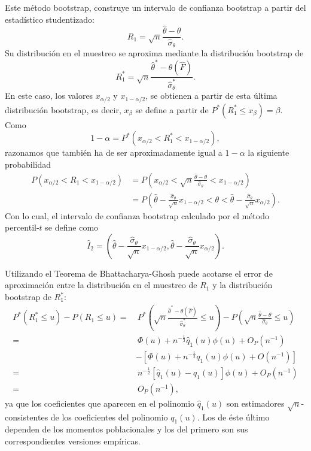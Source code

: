 \documentclass[]{book}
\theoremstyle{definition}
\theoremstyle{definition}
\theoremstyle{definition}
\theoremstyle{remark}
\begin{document}
Este método bootstrap, construye un intervalo de confianza bootstrap a
partir del estadístico studentizado:
\[R_1=\sqrt{n}\frac{\hat{\theta}-\theta }{\hat{\sigma}_{\theta }}.\] Su
distribución en el muestreo se aproxima mediante la distribución
bootstrap de
\[R_1^{\ast}=\sqrt{n}\frac{\hat{\theta}^{\ast}-\theta \left( \hat{F}
 \right)}{\hat{\sigma}_{\theta }^{\ast}}.\] En este caso, los valores
\(x_{\alpha /2}\) y \(x_{1-\alpha /2}\), se obtienen a partir de esta
última distribución bootstrap, es decir, \(x_{\beta }\) se define a
partir de \(P^{\ast}\left( R_1^{\ast}\leq x_{\beta } \right) =\beta\).
Como
\[1-\alpha =P^{\ast}\left( x_{\alpha /2}<R_1^{\ast}<x_{1-\alpha /2} \right),\]
razonamos que también ha de ser aproximadamente igual a \(1-\alpha\) la
siguiente probabilidad \[\begin{aligned}
P\left( x_{\alpha /2}<R_1<x_{1-\alpha /2} \right) &= P\left( x_{\alpha /2}<
\sqrt{n}\frac{\hat{\theta}-\theta }{\hat{\sigma}_{\theta }}<x_{1-\alpha
/2} \right) \\
&= P\left( \hat{\theta}-\frac{\hat{\sigma}_{\theta }}{\sqrt{n}}x_{1-\alpha
/2}<\theta <\hat{\theta}-\frac{\hat{\sigma}_{\theta }}{\sqrt{n}}x_{\alpha
/2} \right).
\end{aligned}\] Con lo cual, el intervalo de confianza bootstrap
calculado por el método percentil-\(t\) se define como
\[\hat{I}_2=\left( \hat{\theta}-\frac{\hat{\sigma}_{\theta }}{\sqrt{n}}
x_{1-\alpha /2},\hat{\theta}-\frac{\hat{\sigma}_{\theta }}{\sqrt{n}}
x_{\alpha /2} \right).\]

Utilizando el Teorema de Bhattacharya-Ghosh puede acotarse el error de
aproximación entre la distribución en el muestreo de \(R_1\) y la
distribución bootstrap de \(R_1^{\ast}\): \[\begin{aligned}
P^{\ast}\left( R_1^{\ast}\leq u \right) -P\left( R_1\leq u \right)
=&\ P^{\ast}\left( \sqrt{n}\frac{\hat{\theta}^{\ast}-\theta \left( \hat{F}
 \right)}{\hat{\sigma}_{\theta }^{\ast}}\leq u \right)-P\left( \sqrt{n}
\frac{\hat{\theta}-\theta }{\hat{\sigma}_{\theta }}\leq u \right)  \\
=&\  \Phi \left( u \right) +n^{-\frac{1}{2}}\hat{q}_1\left( u \right) \phi
\left( u \right) +O_{P}\left( n^{-1} \right) \\
&-\left[ \Phi \left( u \right) +n^{-\frac{1}{2}}q_1\left( u \right) \phi
\left( u \right) +O\left( n^{-1} \right) \right] \\
=&\  n^{-\frac{1}{2}}\left[ \hat{q}_1\left( u \right) -q_1\left( u \right) 
\right] \phi \left( u \right) +O_{P}\left( n^{-1} \right) \\
=&\ O_{P}\left( n^{-1} \right),
\end{aligned}\] ya que los coeficientes que aparecen en el polinomio
\(\hat{q}_1\left( u \right)\) son estimadores \(\sqrt{n}\)-consistentes
de los coeficientes del polinomio \(q_1\left( u \right)\). Los de éste
último dependen de los momentos poblacionales y los del primero son sus
correspondientes versiones empíricas.
\end{document}

